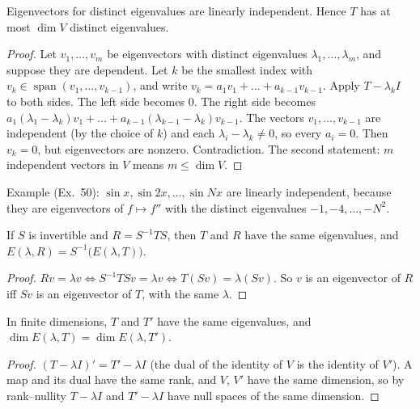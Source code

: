 \documentclass[10pt]{scrartcl}
\DeclareMathOperator{\spn}{span}
\begin{document}
\begin{proposition*}
  Eigenvectors for distinct eigenvalues are linearly independent. Hence $T$ has at most $\dim V$ distinct eigenvalues.
\end{proposition*}
\begin{proof}
  Let $v_1,\dots,v_m$ be eigenvectors with distinct eigenvalues $\lambda_1,\dots,\lambda_m$, and suppose they are dependent. Let $k$ be the smallest index with $v_k\in\spn(v_1,\dots,v_{k-1})$, and write $v_k=a_1v_1+\dots+a_{k-1}v_{k-1}$. Apply $T-\lambda_kI$ to both sides. The left side becomes $0$. The right side becomes $a_1(\lambda_1-\lambda_k)v_1+\dots+a_{k-1}(\lambda_{k-1}-\lambda_k)v_{k-1}$. The vectors $v_1,\dots,v_{k-1}$ are independent (by the choice of $k$) and each $\lambda_i-\lambda_k\ne0$, so every $a_i=0$. Then $v_k=0$, but eigenvectors are nonzero. Contradiction.
  The second statement: $m$ independent vectors in $V$ means $m\le\dim V$.
\end{proof}
Example (Ex.~50): $\sin x,\sin2x,\dots,\sin Nx$ are linearly independent, because they are eigenvectors of $f\mapsto f''$ with the distinct eigenvalues $-1,-4,\dots,-N^2$.

\begin{proposition*}
  If $S$ is invertible and $R=S^{-1}TS$, then $T$ and $R$ have the same eigenvalues, and $E(\lambda,R)=S^{-1}\big(E(\lambda,T)\big)$.
\end{proposition*}
\begin{proof}
  $Rv=\lambda v\iff S^{-1}TSv=\lambda v\iff T(Sv)=\lambda(Sv)$. So $v$ is an eigenvector of $R$ iff $Sv$ is an eigenvector of $T$, with the same $\lambda$.
\end{proof}

\begin{proposition*}
  In finite dimensions, $T$ and $T'$ have the same eigenvalues, and $\dim E(\lambda,T)=\dim E(\lambda,T')$.
\end{proposition*}
\begin{proof}
  $(T-\lambda I)'=T'-\lambda I$ (the dual of the identity of $V$ is the identity of $V'$). A map and its dual have the same rank, and $V$, $V'$ have the same dimension, so by rank--nullity $T-\lambda I$ and $T'-\lambda I$ have null spaces of the same dimension.
\end{proof}
\end{document}
